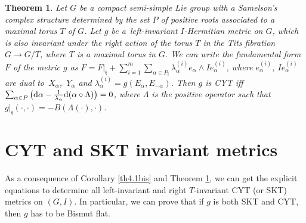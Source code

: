 \documentclass[10pt,a4paper]{amsart}
\numberwithin{equation}{section}
\newtheorem{Theorem}{Theorem}[section]
\begin{document}
\begin{Theorem} \label{th4.1}
Let $G$ be a compact semi-simple Lie group with a Samelson's complex structure determined by the set $P$ of positive roots associated to a maximal torus $T$ of $G$. Let $g$ be a~left-invariant $I$-Hermitian metric on $G$, which is also invariant under the right action of the torus $T$ in the Tits fibration $G\rightarrow G/T$, where $T$ is a maximal torus in $G$. We can write the fundamental form $F$ of the metric $g$
as $F = F|_{\mathfrak t} + \sum_{i=1}^m \sum_{\alpha \in P_i} \lambda_{\alpha} ^{(i)} e_{\alpha}\wedge I e_{\alpha}^{(i)}$, where $e_{\alpha}^{(i)}$, $Ie_{\alpha}^{(i)}$ are dual to~$X_{\alpha}$,~$Y_{\alpha}$ and $\lambda_{\alpha} ^{(i)}= g (E_{\alpha}, E_{-\alpha})$. Then
$g$ is CYT iff $\sum_{\alpha \in P} \big({\rm d}\alpha - \frac{1}{\lambda_{\alpha}} {\rm d}(\alpha\circ\Lambda) \big) = 0$, where $\Lambda$ is the positive operator such that $g |_{\mathfrak t} (\cdot, \cdot ) = -B (\Lambda (\cdot), \cdot)$.
\end{Theorem}

\section{CYT and SKT invariant metrics}

As a consequence of Corollary \ref{th4.1bis} and Theorem \ref{th4.1}, we can get the explicit equations to determine all left-invariant and right $T$-invariant CYT (or SKT) metrics on $(G, I).$ In particular, we can prove that if $g$ is both SKT and CYT, then $g$ has to be Bismut flat.
\end{document}
